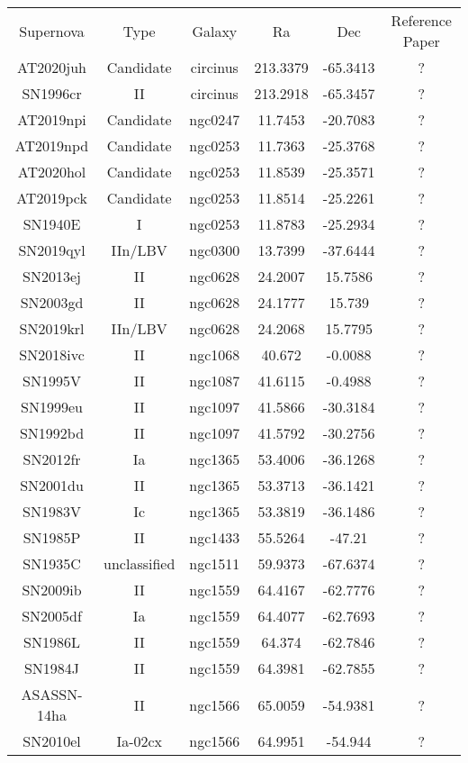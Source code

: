 \begin{table}
\begin{tabular}{cccccc}
Supernova & Type & Galaxy & Ra & Dec & Reference Paper \\
AT2020juh & Candidate & circinus & 213.3379 & -65.3413 & ? \\
SN1996cr & II & circinus & 213.2918 & -65.3457 & ? \\
AT2019npi & Candidate & ngc0247 & 11.7453 & -20.7083 & ? \\
AT2019npd & Candidate & ngc0253 & 11.7363 & -25.3768 & ? \\
AT2020hol & Candidate & ngc0253 & 11.8539 & -25.3571 & ? \\
AT2019pck & Candidate & ngc0253 & 11.8514 & -25.2261 & ? \\
SN1940E & I & ngc0253 & 11.8783 & -25.2934 & ? \\
SN2019qyl & IIn/LBV & ngc0300 & 13.7399 & -37.6444 & ? \\
SN2013ej & II & ngc0628 & 24.2007 & 15.7586 & ? \\
SN2003gd & II & ngc0628 & 24.1777 & 15.739 & ? \\
SN2019krl & IIn/LBV & ngc0628 & 24.2068 & 15.7795 & ? \\
SN2018ivc & II & ngc1068 & 40.672 & -0.0088 & ? \\
SN1995V & II & ngc1087 & 41.6115 & -0.4988 & ? \\
SN1999eu & II & ngc1097 & 41.5866 & -30.3184 & ? \\
SN1992bd & II & ngc1097 & 41.5792 & -30.2756 & ? \\
SN2012fr & Ia & ngc1365 & 53.4006 & -36.1268 & ? \\
SN2001du & II & ngc1365 & 53.3713 & -36.1421 & ? \\
SN1983V & Ic & ngc1365 & 53.3819 & -36.1486 & ? \\
SN1985P & II & ngc1433 & 55.5264 & -47.21 & ? \\
SN1935C & unclassified & ngc1511 & 59.9373 & -67.6374 & ? \\
SN2009ib & II & ngc1559 & 64.4167 & -62.7776 & ? \\
SN2005df & Ia & ngc1559 & 64.4077 & -62.7693 & ? \\
SN1986L & II & ngc1559 & 64.374 & -62.7846 & ? \\
SN1984J & II & ngc1559 & 64.3981 & -62.7855 & ? \\
ASASSN-14ha & II & ngc1566 & 65.0059 & -54.9381 & ? \\
SN2010el & Ia-02cx & ngc1566 & 64.9951 & -54.944 & ? \\

\end{tabular}
\end{table}
